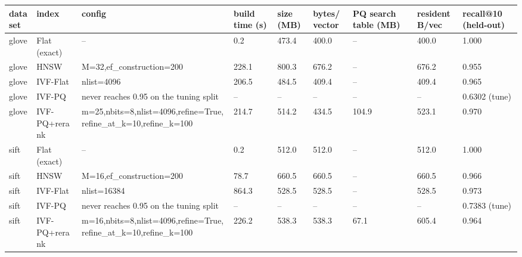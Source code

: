 \begin{tabular}{lllllllll}
\hline
dataset & index & config & build time (s) & size (MB) & bytes/vector & PQ search table (MB) & resident B/vec & recall@10 (held-out) \\
\hline
glove & Flat (exact) & -- & 0.2 & 473.4 & 400.0 & -- & 400.0 & 1.000 \\
glove & HNSW & M=32,ef\_construction=200 & 228.1 & 800.3 & 676.2 & -- & 676.2 & 0.955 \\
glove & IVF-Flat & nlist=4096 & 206.5 & 484.5 & 409.4 & -- & 409.4 & 0.965 \\
glove & IVF-PQ & never reaches 0.95 on the tuning split & -- & -- & -- & -- & -- & 0.6302 (tune) \\
glove & IVF-PQ+rerank & m=25,nbits=8,nlist=4096,refine=True,refine\_at\_k=10,refine\_k=100 & 214.7 & 514.2 & 434.5 & 104.9 & 523.1 & 0.970 \\
sift & Flat (exact) & -- & 0.2 & 512.0 & 512.0 & -- & 512.0 & 1.000 \\
sift & HNSW & M=16,ef\_construction=200 & 78.7 & 660.5 & 660.5 & -- & 660.5 & 0.966 \\
sift & IVF-Flat & nlist=16384 & 864.3 & 528.5 & 528.5 & -- & 528.5 & 0.973 \\
sift & IVF-PQ & never reaches 0.95 on the tuning split & -- & -- & -- & -- & -- & 0.7383 (tune) \\
sift & IVF-PQ+rerank & m=16,nbits=8,nlist=4096,refine=True,refine\_at\_k=10,refine\_k=100 & 226.2 & 538.3 & 538.3 & 67.1 & 605.4 & 0.964 \\
\hline
\end{tabular}
